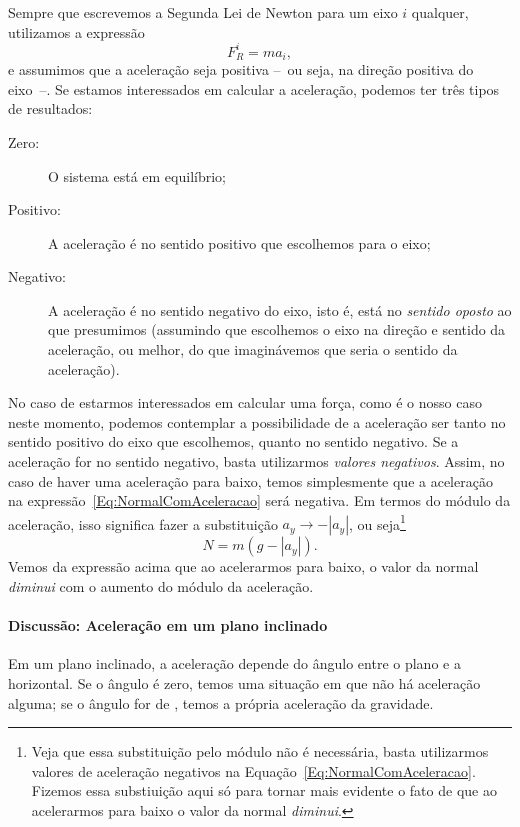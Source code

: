 Sempre que escrevemos a Segunda Lei de Newton para um eixo $i$ qualquer, utilizamos a expressão
\begin{equation}
    F_R^i = m a_i,
\end{equation}
%
e assumimos que a aceleração seja positiva --~ou seja, na direção positiva do eixo~--. Se estamos interessados em calcular a aceleração, podemos ter três tipos de resultados:
\begin{description}
    \item[Zero:] O sistema está em equilíbrio;
    \item[Positivo:] A aceleração é no sentido positivo que escolhemos para o eixo;
    \item[Negativo:] A aceleração é no sentido negativo do eixo, isto é, está no \emph{sentido oposto} ao que presumimos (assumindo que escolhemos o eixo na direção e sentido da aceleração, ou melhor, do que imaginávemos que seria o sentido da aceleração).
\end{description}

No caso de estarmos interessados em calcular uma força, como é o nosso caso neste momento, podemos contemplar a possibilidade de a aceleração ser tanto no sentido positivo do eixo que escolhemos, quanto no sentido negativo. Se a aceleração for no sentido negativo, basta utilizarmos \emph{valores negativos}. Assim, no caso de haver uma aceleração para baixo, temos simplesmente que a aceleração na expressão~\eqref{Eq:NormalComAceleracao} será negativa. Em termos do módulo da aceleração, isso significa fazer a substituição $a_y \to -|a_y|$, ou seja\footnote{Veja que essa substituição pelo módulo não é necessária, basta utilizarmos valores de aceleração negativos na Equação~\ref{Eq:NormalComAceleracao}. Fizemos essa substiuição aqui só para tornar mais evidente o fato de que ao acelerarmos para baixo o valor da normal \emph{diminui}.}
\begin{equation}
    N = m(g - |a_y|).
\end{equation} 
%
Vemos da expressão acima que ao acelerarmos para baixo, o valor da normal \emph{diminui} com o aumento do módulo da aceleração.

\paragraph{Discussão: Aceleração em um plano inclinado}

Em um plano inclinado, a aceleração depende do ângulo entre o plano e a horizontal. Se o ângulo é zero, temos uma situação em que não há aceleração alguma; se o ângulo for de , temos a própria aceleração da gravidade.

